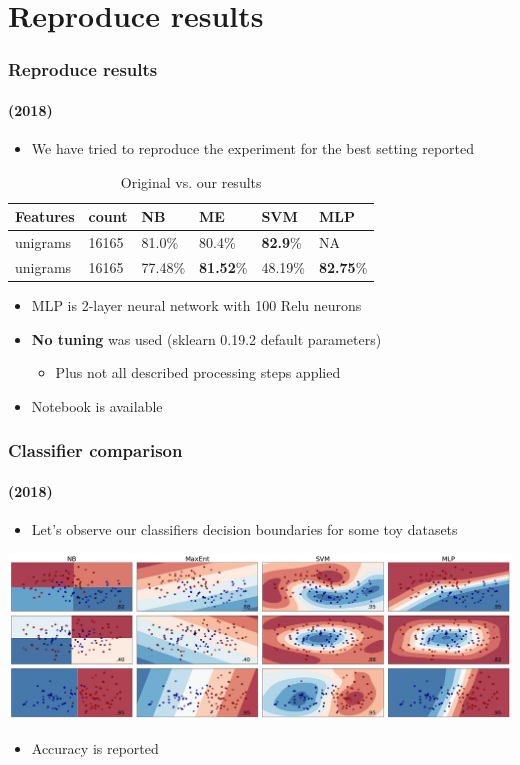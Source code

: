 \documentclass{beamer}
\begin{document}
\section{Reproduce results}
\begin{frame}
	\frametitle{Reproduce results}
	\framesubtitle{(2018)}
	\begin{itemize}
		\item We have tried to reproduce the experiment for the best setting reported
	\end{itemize}
	\begin{center}
		\begin{table}
			\begin{tabular}{l | l | l || l | l | l}
				Features & count & NB & ME & SVM & MLP\\ \hline \hline
				unigrams & 16165 & 81.0\% & 80.4\% & \textbf{82.9}\% & NA \pause \\
				unigrams & 16165 & 77.48\% & \textbf{81.52}\% & 48.19\% & \textbf{82.75}\%  \\
			\end{tabular}
			\caption{Original vs. our results}
		\end{table}
	\end{center} \pause
	\begin{itemize}
		\item MLP is 2-layer neural network with 100 Relu neurons
		\item \textbf{No tuning} was used (sklearn 0.19.2 default parameters)
		\begin{itemize}
			\item Plus not all described processing steps applied 
		\end{itemize}
		\item Notebook is available \href{https://github.com/dorcoh/sentiment-emnlp/blob/master/experiment/sentiment-analysis-emnlp2002.ipynb}{}
	\end{itemize}
\end{frame}

\begin{frame}
	\frametitle{Classifier comparison}
	\framesubtitle{(2018)}
	\begin{itemize}
		\item Let's observe our classifiers decision boundaries for some toy datasets \pause
	\end{itemize}
	\begin{center}
		\includegraphics[scale=0.26]{comparison}
	\end{center}
	\begin{itemize}
		\item Accuracy is reported
	\end{itemize}
\end{frame}
\end{document}
